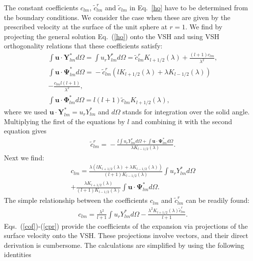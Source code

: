 \documentclass[aps,prx,twocolumn,amsmath,amssymb,amsfonts]{revtex4-2}
\begin{document}
The constant coefficients $c_{lm}$, ${\tilde c}^{r}_{lm}$ and ${\tilde c}_{lm}$ in Eq.~\ref{ho} have to be determined from the boundary conditions. We consider the case when these are given by the prescribed velocity at the surface of the unit sphere at $r\!=\!1$. We find by projecting the general solution Eq.~(\ref{ho}) onto the VSH and using VSH orthogonality relations \cite{sph} that these coefficients satisfy:
\begin{eqnarray}&&
\int \bm u\cdot \bm Y_{lm}^* d\Omega\!=\!\int u_r Y_{lm}^* d\Omega\!=\! {\tilde c}^{r}_{lm} K_{l+1/2}(\lambda)+\frac{(l+1)c_{lm}}{\lambda^2},\nonumber\\&&
\int \bm u\cdot \bm \Psi_{lm}^* d\Omega\!=\!-{\tilde c}^{r}_{lm} \left(l K_{l+1/2}(\lambda)
\!+\!\lambda K_{l-1/2}(\lambda)\right)
\nonumber\\&&
-\frac{c_{lm}l(l+1)}{\lambda^2}, \nonumber\\&&
\int \bm u\cdot \bm \Phi_{lm}^* d\Omega\!=\!l(l+1){\tilde c}_{lm} K_{l+1/2}(\lambda), \label{cof}
\end{eqnarray}
where we used $\bm u\cdot \bm Y_{lm}^* =u_r Y_{lm}^*$ and $d\Omega$ stands for integration over the solid angle. Multiplying the first of the equations by $l$ and combining it with the second equation gives
\begin{eqnarray}&&
{\tilde c}^{r}_{lm} \!=\!-\frac{l\int u_r Y_{lm}^* d\Omega+\int \bm u\cdot \bm \Psi_{lm}^* d\Omega}{\lambda K_{l-1/2}(\lambda)}. \label{tld}
\end{eqnarray}
Next we find:
\begin{eqnarray}&&
c_{lm}\!=\! \frac{ \lambda\left(l K_{l+1/2}(\lambda)
\!+\!\lambda K_{l-1/2}(\lambda)\right)}{(l\!+\!1) K_{l-1/2}(\lambda)}\int \!u_r Y_{lm}^* d\Omega
\nonumber\\&&
+\frac{\lambda K_{l+1/2}(\lambda)}{(l\!+\!1) K_{l-1/2}(\lambda)}\int\! \bm u\!\cdot\! \bm \Psi_{lm}^* d\Omega.\label{cpr}
\end{eqnarray}
The simple relationship between the coefficients $c_{lm}$ and ${\tilde c}^{r}_{lm}$ can be readily found:
\begin{eqnarray}&&
c_{lm}\!=\! \frac{ \lambda^2}{l\!+\!1}\int\! u_r Y_{lm}^* d\Omega-\frac{\lambda^2K_{l+1/2}(\lambda){\tilde c}^{r}_{lm}}{l\!+\!1}.\label{coper}
\end{eqnarray}
Eqs.~(\ref{cof})-(\ref{cpr}) provide the coefficients of the expansion via projections of the surface velocity onto the VSH. These projections involve vectors, and their direct derivation is cumbersome. The calculations are simplified by using the following identities
\end{document}
